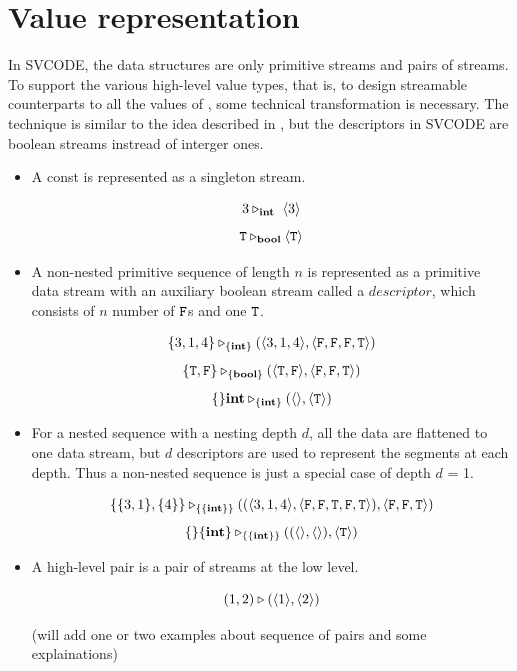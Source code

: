 \section{Value representation}
In SVCODE, the data structures are only primitive streams and pairs of streams. 
To support the various high-level value types, that is, to design streamable counterparts to all the values of \mysnesl, some technical transformation is necessary.  
The technique is similar to the idea described in \cite{prins93}, but the descriptors in SVCODE are boolean streams instread of interger ones.

\begin{itemize}
	\item A const is represented as a singleton stream. 
	\begin{example}
		$$3 \tr_\int \ \< 3 \'>$$
		$$ \mathtt{T} \triangleright_{\mathbf{bool}} \langle \mathtt{T} \rangle $$
	\end{example}
	
	
	
	\item A non-nested primitive sequence of length $n$ is represented as a primitive data stream with an auxiliary boolean stream called a $descriptor$, which consists of $n$ number of $\mathtt{F}$s and one $\mathtt{T}$. 
	\begin{example}
		$$\{3,1,4\} \tr_{\{\int\}} (\< 3,1,4 \'>, \< \F, \F,\F , \T \'>) $$
	    $$\{\T,\F\} \tr_{\{\bool\}} (\< \T,\F\'>, \< \F,\F , \T \'>) $$
		$$\{\}\mathbf{int} \triangleright_{\{\mathbf{int} \}} (\langle \rangle, \langle \mathtt{T} \rangle)$$
	\end{example}
	
	\item For a nested sequence with a nesting depth $d$, all the data are flattened to one data stream, but $d$ descriptors are used to represent the segments at each depth. 
	Thus a non-nested sequence is just a special case of depth $d$ = 1.
	
	\begin{example}
		$$\{\{3,1\}, \{4\}\} \tr_{\{\{\int\}\}} ((\< 3,1,4 \'>, \<\F,\F,\T,\F,\T \'>),\< \F, \F, \T \'>)  $$
		$$\{\}\{\mathbf{int}\} \triangleright_{\{\{\mathbf{int}\}\}} ((\langle \rangle, \langle \rangle), \langle \mathtt{T} \rangle)$$
	\end{example}
	
%	
%

\item A high-level pair is a pair of streams at the low level.  
\begin{example}
	$$(1,2) \triangleright (\langle 1 \rangle, \langle 2 \rangle)$$
\end{example} 

(will add one or two examples about sequence of pairs and some explainations)
\end{itemize}

